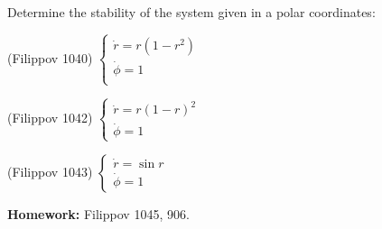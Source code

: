 \documentclass[14pt]{exam}
\begin{document}
	Determine the stability of the system given in a polar coordinates:
	\begin{questions}
		\setcounter{question}{8}
		\question
		(Filippov 1040)
		$\begin{cases}
			\dot{r} = r(1 - r^2)\\
			\dot{\phi} = 1\\
		\end{cases}$
		
		\question
		(Filippov 1042)
		$\begin{cases}
			\dot{r} = r(1 - r)^2\\
			\dot{\phi} = 1
		\end{cases}$
		
		\question
		(Filippov 1043)
		$\begin{cases}
			\dot{r} = \sin r\\
			\dot{\phi} = 1
		\end{cases}$
	\end{questions}
	
	\textbf{Homework:} Filippov 1045, 906.
\end{document}
